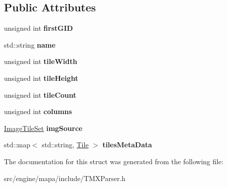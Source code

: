 \subsection*{Public Attributes}
\begin{DoxyCompactItemize}
\item 
unsigned int {\bfseries first\+G\+ID}\hypertarget{struct_t_m_x_1_1_parser_1_1_tileset_aeae321ffe9bccf6aeab99e5be5ab93f7}{}\label{struct_t_m_x_1_1_parser_1_1_tileset_aeae321ffe9bccf6aeab99e5be5ab93f7}

\item 
std\+::string {\bfseries name}\hypertarget{struct_t_m_x_1_1_parser_1_1_tileset_ab1c10a8f35f0243dc88df45f7bd0e22f}{}\label{struct_t_m_x_1_1_parser_1_1_tileset_ab1c10a8f35f0243dc88df45f7bd0e22f}

\item 
unsigned int {\bfseries tile\+Width}\hypertarget{struct_t_m_x_1_1_parser_1_1_tileset_ab7a27656de45902eabe7ed2affebb805}{}\label{struct_t_m_x_1_1_parser_1_1_tileset_ab7a27656de45902eabe7ed2affebb805}

\item 
unsigned int {\bfseries tile\+Height}\hypertarget{struct_t_m_x_1_1_parser_1_1_tileset_ac930338e43d277d6f050d933d2d134e4}{}\label{struct_t_m_x_1_1_parser_1_1_tileset_ac930338e43d277d6f050d933d2d134e4}

\item 
unsigned int {\bfseries tile\+Count}\hypertarget{struct_t_m_x_1_1_parser_1_1_tileset_a986cc4870ba89ccda47254c2e31156d4}{}\label{struct_t_m_x_1_1_parser_1_1_tileset_a986cc4870ba89ccda47254c2e31156d4}

\item 
unsigned int {\bfseries columns}\hypertarget{struct_t_m_x_1_1_parser_1_1_tileset_a3cbe0a85ba00d619c51d358718bd1466}{}\label{struct_t_m_x_1_1_parser_1_1_tileset_a3cbe0a85ba00d619c51d358718bd1466}

\item 
\hyperlink{struct_t_m_x_1_1_parser_1_1_image_tile_set}{Image\+Tile\+Set} {\bfseries img\+Source}\hypertarget{struct_t_m_x_1_1_parser_1_1_tileset_ad4517705ccdd1c25e4d3dc75d7c245d9}{}\label{struct_t_m_x_1_1_parser_1_1_tileset_ad4517705ccdd1c25e4d3dc75d7c245d9}

\item 
std\+::map$<$ std\+::string, \hyperlink{struct_t_m_x_1_1_parser_1_1_tile}{Tile} $>$ {\bfseries tiles\+Meta\+Data}\hypertarget{struct_t_m_x_1_1_parser_1_1_tileset_a39f0b096e726abd205f16d1346fb12d3}{}\label{struct_t_m_x_1_1_parser_1_1_tileset_a39f0b096e726abd205f16d1346fb12d3}

\end{DoxyCompactItemize}


The documentation for this struct was generated from the following file\+:\begin{DoxyCompactItemize}
\item 
src/engine/mapa/include/T\+M\+X\+Parser.\+h\end{DoxyCompactItemize}
